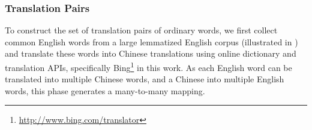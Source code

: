 %
%
%

\subsubsection{Translation Pairs}

%
%
To construct the set of translation pairs of ordinary words, we first collect common
English words from a large lemmatized English corpus (illustrated in  ) and translate
these words into Chinese translations using online
dictionary and translation APIs,
specifically Bing\footnote{\url{http://www.bing.com/translator}} in this work. As each English word can be translated into multiple Chinese words, and a Chinese into multiple English words, this phase generates
a many-to-many mapping.

